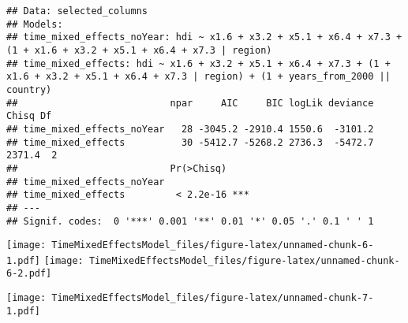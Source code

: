 \documentclass[
]{article}
\begin{document}
\begin{verbatim}
## Data: selected_columns
## Models:
## time_mixed_effects_noYear: hdi ~ x1.6 + x3.2 + x5.1 + x6.4 + x7.3 + (1 + x1.6 + x3.2 + x5.1 + x6.4 + x7.3 | region)
## time_mixed_effects: hdi ~ x1.6 + x3.2 + x5.1 + x6.4 + x7.3 + (1 + x1.6 + x3.2 + x5.1 + x6.4 + x7.3 | region) + (1 + years_from_2000 || country)
##                           npar     AIC     BIC logLik deviance  Chisq Df
## time_mixed_effects_noYear   28 -3045.2 -2910.4 1550.6  -3101.2          
## time_mixed_effects          30 -5412.7 -5268.2 2736.3  -5472.7 2371.4  2
##                           Pr(>Chisq)    
## time_mixed_effects_noYear               
## time_mixed_effects         < 2.2e-16 ***
## ---
## Signif. codes:  0 '***' 0.001 '**' 0.01 '*' 0.05 '.' 0.1 ' ' 1
\end{verbatim}

\texttt{[image: TimeMixedEffectsModel\_files/figure-latex/unnamed-chunk-6-1.pdf]}
\texttt{[image: TimeMixedEffectsModel\_files/figure-latex/unnamed-chunk-6-2.pdf]}

\texttt{[image: TimeMixedEffectsModel\_files/figure-latex/unnamed-chunk-7-1.pdf]}
\end{document}
